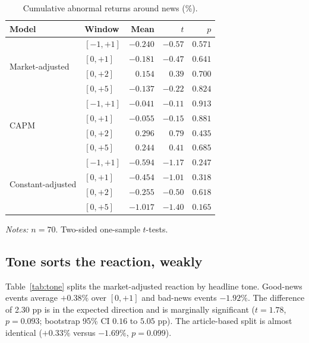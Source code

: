 \documentclass[10pt,twocolumn,a4paper]{article}
\begin{document}
\begin{table}[t]
\centering
\small
\begin{threeparttable}
\caption{Cumulative abnormal returns around news (\%).}
\label{tab:car}
\begin{tabular}{@{}llrrr@{}}
\toprule
Model & Window & Mean & $t$ & $p$ \\
\midrule
\multirow{4}{*}{Market-adjusted} & $[-1,+1]$ & $-0.240$ & $-0.57$ & $0.571$ \\
 & $[0,+1]$ & $-0.181$ & $-0.47$ & $0.641$ \\
 & $[0,+2]$ & $0.154$ & $0.39$ & $0.700$ \\
 & $[0,+5]$ & $-0.137$ & $-0.22$ & $0.824$ \\
\midrule
\multirow{4}{*}{CAPM} & $[-1,+1]$ & $-0.041$ & $-0.11$ & $0.913$ \\
 & $[0,+1]$ & $-0.055$ & $-0.15$ & $0.881$ \\
 & $[0,+2]$ & $0.296$ & $0.79$ & $0.435$ \\
 & $[0,+5]$ & $0.244$ & $0.41$ & $0.685$ \\
\midrule
\multirow{4}{*}{Constant-adjusted} & $[-1,+1]$ & $-0.594$ & $-1.17$ & $0.247$ \\
 & $[0,+1]$ & $-0.454$ & $-1.01$ & $0.318$ \\
 & $[0,+2]$ & $-0.255$ & $-0.50$ & $0.618$ \\
 & $[0,+5]$ & $-1.017$ & $-1.40$ & $0.165$ \\
\bottomrule
\end{tabular}
\begin{tablenotes}[flushleft]\footnotesize
\item \textit{Notes:} $n=70$. Two-sided one-sample $t$-tests.
\end{tablenotes}
\end{threeparttable}
\end{table}

\subsection{Tone sorts the reaction, weakly}

Table~\ref{tab:tone} splits the market-adjusted reaction by headline tone. Good-news events average
$+0.38\%$ over $[0,+1]$ and bad-news events $-1.92\%$. The difference of 2.30 pp is in the expected
direction and is marginally significant ($t=1.78$, $p=0.093$; bootstrap 95\% CI $0.16$ to $5.05$ pp).
The article-based split is almost identical ($+0.33\%$ versus $-1.69\%$, $p=0.099$).
\end{document}
